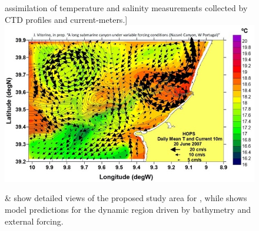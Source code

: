 \begin{figure}[!h]
  assimilation of temperature and salinity measurements collected by
  CTD profiles and
  current-meters.]{\label{fig:model}\includegraphics[scale=0.50]{fig/model.jpeg}}
  \caption{ \&  show detailed
    views of the proposed study area for \proje, while
     shows model predictions for the dynamic region
    driven by bathymetry and external forcing.}
  \label{fig:studyarea-1}
\end{figure}


